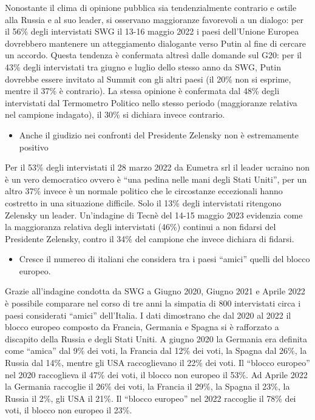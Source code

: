 \documentclass[
  openany]{book}
\providecommand{\tightlist}{%
  \setlength{\itemsep}{0pt}\setlength{\parskip}{0pt}}
\begin{document}
Nonostante il clima di opinione pubblica sia tendenzialmente contrario e ostile alla Russia e al suo leader, si osservano maggioranze favorevoli a un dialogo: per il 56\% degli intervistati SWG il 13-16 maggio 2022 i paesi dell'Unione Europea dovrebbero mantenere un atteggiamento dialogante verso Putin al fine di cercare un accordo. Questa tendenza è confermata altresì dalle domande sul G20: per il 43\% degli intervistati tra giugno e luglio dello stesso anno da SWG, Putin dovrebbe essere invitato al Summit con gli altri paesi (il 20\% non si esprime, mentre il 37\% è contrario). La stessa opinione è confermata dal 48\% degli intervistati dal Termometro Politico nello stesso periodo (maggioranze relativa nel campione indagato), il 30\% si dichiara invece contrario.

\begin{itemize}
\tightlist
\item
  Anche il giudizio nei confronti del Presidente Zelensky non è estremamente positivo
\end{itemize}

Per il 53\% degli intervistati il 28 marzo 2022 da Eumetra srl il leader ucraino non è un vero democratico ovvero è ``una pedina nelle mani degli Stati Uniti'', per un altro 37\% invece è un normale politico che le circostanze eccezionali hanno costretto in una situazione difficile. Solo il 13\% degli intervistati ritengono Zelensky un leader. Un'indagine di Tecnè del 14-15 maggio 2023 evidenzia come la maggioranza relativa degli intervistati (46\%) continui a non fidarsi del Presidente Zelensky, contro il 34\% del campione che invece dichiara di fidarsi.

\begin{itemize}
\tightlist
\item
  Cresce il numereo di italiani che considera tra i paesi ``amici'' quelli del blocco europeo.
\end{itemize}

Grazie all'indagine condotta da SWG a Giugno 2020, Giugno 2021 e Aprile 2022 è possibile comparare nel corso di tre anni la simpatia di 800 intervistati circa i paesi considerati ``amici'' dell'Italia. I dati dimostrano che dal 2020 al 2022 il blocco europeo composto da Francia, Germania e Spagna si è rafforzato a discapito della Russia e degli Stati Uniti. A giugno 2020 la Germania era definita come ``amica'' dal 9\% dei voti, la Francia dal 12\% dei voti, la Spagna dal 26\%, la Russia dal 14\%, mentre gli USA raccoglievano il 22\% dei voti. Il ``blocco europeo'' nel 2020 raccoglieva il 47\% dei voti, il blocco non europeo il 53\%. Ad Aprile 2022 la Germania raccoglie il 26\% dei voti, la Francia il 29\%, la Spagna il 23\%, la Russia il 2\%, gli USA il 21\%. Il ``blocco europeo'' nel 2022 raccoglie il 78\% dei voti, il blocco non europeo il 23\%.
\end{document}
